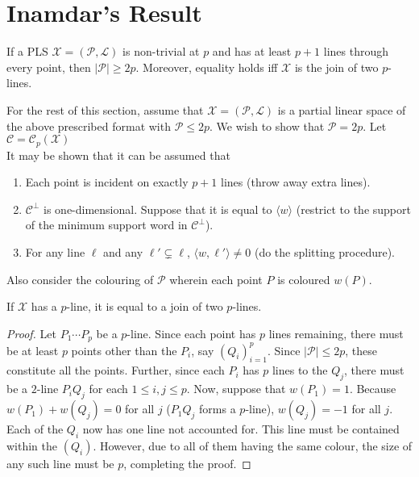 \documentclass{article}
\begin{document}
\section{Inamdar's Result}


	\begin{ftheo}
		If a PLS $\mathcal{X} = (\mathcal{P},\mathcal{L})$ is non-trivial at $p$ and has at least $p+1$ lines through every point, then $|\mathcal{P}| \ge 2p$. Moreover, equality holds iff $\mathcal{X}$ is the join of two $p$-lines.
	\end{ftheo}

	For the rest of this section, assume that $\mathcal{X} = (\mathcal{P},\mathcal{L})$ is a partial linear space of the above prescribed format with $\mathcal{P} \le 2p$. We wish to show that $\mathcal{P} = 2p$. Let $\mathcal{C} = \mathcal{C}_p(\mathcal{X})$\\
	It may be shown that it can be assumed that 
	\begin{enumerate}
		\item Each point is incident on exactly $p+1$ lines (throw away extra lines).
		\item $\mathcal{C}^\perp$ is one-dimensional. Suppose that it is equal to $\langle w \rangle$ (restrict to the support of the minimum support word in $\mathcal{C}^\perp$).
		\item For any line $\ell$ and any $\ell' \subsetneq \ell$, $\langle w,\ell'\rangle \ne 0$ (do the splitting procedure).
	\end{enumerate}
	
	Also consider the colouring of $\mathcal{P}$ wherein each point $P$ is coloured $w(P)$.

	\begin{prop}
		If $\mathcal{X}$ has a $p$-line, it is equal to a join of two $p$-lines.
	\end{prop}
	\begin{proof}
		Let $P_1\cdots P_p$ be a $p$-line. Since each point has $p$ lines remaining, there must be at least $p$ points other than the $P_i$, say $(Q_i)_{i=1}^p$. Since $|\mathcal{P}| \le 2p$, these constitute all the points. Further, since each $P_i$ has $p$ lines to the $Q_j$, there must be a $2$-line $P_iQ_j$ for each $1\le i,j \le p$. Now, suppose that $w(P_1) = 1$. Because $w(P_1) + w(Q_j) = 0$ for all $j$ ($P_1 Q_j$ forms a $p$-line), $w(Q_j) = -1$ for all $j$. Each of the $Q_i$ now has one line not accounted for. This line must be contained within the $(Q_i)$. However, due to all of them having the same colour, the size of any such line must be $p$, completing the proof.
	\end{proof}
\end{document}
